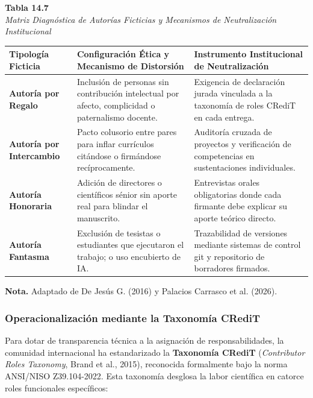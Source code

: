 \begin{table}[htbp]
\centering
\small
\renewcommand{\arraystretch}{1.25}
\textbf{Tabla 14.7}\\[0.15cm]
\textit{Matriz Diagnóstica de Autorías Ficticias y Mecanismos de Neutralización Institucional}\\[0.25cm]
\begin{tabularx}{\textwidth}{p{2.8cm}X p{5.5cm}}
\toprule
\textbf{Tipología Ficticia} & \textbf{Configuración Ética y Mecanismo de Distorsión} & \textbf{Instrumento Institucional de Neutralización} \\
\midrule
\textbf{Autoría por Regalo} & Inclusión de personas sin contribución intelectual por afecto, complicidad o paternalismo docente. & Exigencia de declaración jurada vinculada a la taxonomía de roles CRediT en cada entrega. \\
\textbf{Autoría por Intercambio} & Pacto colusorio entre pares para inflar currículos citándose o firmándose recíprocamente. & Auditoría cruzada de proyectos y verificación de competencias en sustentaciones individuales. \\
\textbf{Autoría Honoraria} & Adición de directores o científicos sénior sin aporte real para blindar el manuscrito. & Entrevistas orales obligatorias donde cada firmante debe explicar su aporte teórico directo. \\
\textbf{Autoría Fantasma} & Exclusión de tesistas o estudiantes que ejecutaron el trabajo; o uso encubierto de IA. & Trazabilidad de versiones mediante sistemas de control git y repositorio de borradores firmados. \\
\bottomrule
\end{tabularx}
\vspace{0.15cm}
\raggedright \scriptsize \textbf{Nota.} Adaptado de De Jesús G. (2016) y Palacios Carrasco et al. (2026).
\end{table}

\subsubsection{Operacionalización mediante la Taxonomía CRediT}

Para dotar de transparencia técnica a la asignación de responsabilidades, la comunidad internacional ha estandarizado la \textbf{Taxonomía CRediT} (\textit{Contributor Roles Taxonomy}, Brand et al., 2015), reconocida formalmente bajo la norma ANSI/NISO Z39.104-2022. Esta taxonomía desglosa la labor científica en catorce roles funcionales específicos:

